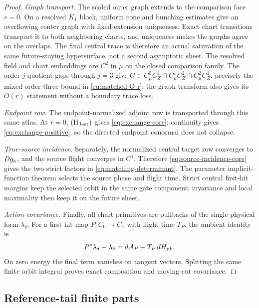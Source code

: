 \documentclass[11pt,reqno]{amsart}
\numberwithin{equation}{section}
\theoremstyle{definition}
\theoremstyle{remark}
\newcommand{\cA}{\mathcal A}
\begin{document}
\begin{proof}
\emph{Graph transport.}
The scaled outer graph extends to the comparison face $r=0$.  On a resolved
$K_1$ block, uniform cone and bunching estimates give an overflowing center
graph with fixed-extension uniqueness.  Exact chart transitions transport it
to both neighboring charts, and uniqueness makes the graphs agree on the
overlaps.  The final central trace is therefore an actual saturation of the
same future-staying hypersurface, not a second asymptotic sheet.  The resolved
field and chart embeddings are $C^2$ in $\mu$ on the closed comparison family.
The order-$j$ quotient gaps through $j=3$ give
$G\in C^0_\mu C^3_Z\cap C^1_\mu C^2_Z\cap C^2_\mu C^1_Z$, precisely the
mixed-order-three bound in \eqref{eq:matched-O-r}; the graph-transform also
gives its $O(r)$ statement without a boundary trace loss.

\emph{Endpoint row.}
The endpoint-normalized adjoint row is transported through this same atlas.
At $r=0$, ${\rm(H_{Jost})}$ gives \eqref{eq:exchange-core}; continuity gives
\eqref{eq:exchange-positive}, so the directed endpoint conormal does not
collapse.

\emph{True-source incidence.}
Separately, the normalized central target row converges to $Dg_{\rm a}$, and
the source flight converges in $C^1$.  Therefore
\eqref{eq:source-incidence-core} gives the two strict factors in
\eqref{eq:matching-determinant}.  The parameter implicit-function theorem
selects the source phase and flight time.  Strict central first-hit margins
keep the selected orbit in the same gate component; invariance and local
maximality then keep it on the future sheet.

\emph{Action covariance.}
Finally, all chart primitives are pullbacks of the single physical form
$\lambda_\delta$.  For a first-hit map $P:C_0\to C_1$ with flight time
$T_P$, the ambient identity is
\begin{equation}\label{eq:first-variation}
 P^*\lambda_\delta-\lambda_\delta
   =d\cA_P+T_P\,dH_{\rm ph}.
\end{equation}
On zero energy the final term vanishes on tangent vectors.  Splitting the
same finite orbit integral proves exact composition and moving-cut
covariance.
\end{proof}

\subsection{Reference-tail finite parts}
\end{document}
